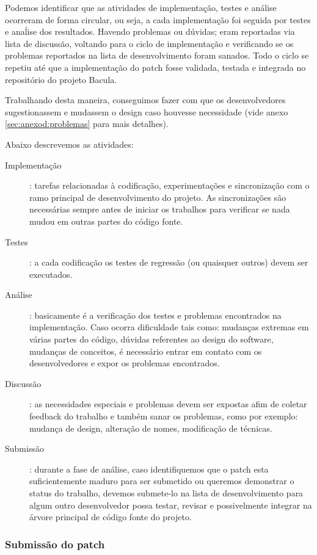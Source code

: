 Podemos identificar que as atividades de implementação, testes e análise ocorreram de forma circular, ou seja, a cada implementação foi seguida por testes e anaĺise dos resultados. Havendo problemas ou dúvidas; eram reportadas via lista de discussão, voltando para o ciclo de implementação e verificando se os problemas reportados na lista de desenvolvimento foram sanados. Todo o ciclo se repetiu até que a implementação do patch \patchshort fosse validada, testada e integrada no repositório do projeto Bacula.

Trabalhando desta maneira, conseguimos fazer com que os desenvolvedores sugestionassem e mudassem o design caso houvesse necessidade (vide anexo \ref{sec:anexod:problemas} para mais detalhes). 

Abaixo descrevemos as atividades:

\begin{description}
\item[Implementação]: tarefas relacionadas à codificação, experimentações e sincronização com o ramo principal de desenvolvimento do projeto. As sincronizações são necessárias sempre antes de iniciar os trabalhos para verificar se nada mudou em outras partes do código fonte.
\item[Testes]: a cada codificação os testes de regressão (ou quaisquer outros) devem ser executados.
\item[Análise]: basicamente é a verificação dos testes e problemas encontrados na implementação. Caso ocorra dificuldade tais como: mudanças extremas em várias partes do código, dúvidas referentes ao design do software, mudanças de conceitos, é necessário entrar em contato com os desenvolvedores e expor os problemas encontrados.
\item[Discussão]: as necessidades especiais e problemas devem ser expostas afim de coletar feedback do trabalho e também sanar os problemas, como por exemplo: mudança de design, alteração de nomes, modificação de técnicas.
\item[Submissão]: durante a fase de análise, caso identifiquemos que o patch esta suficientemente maduro para ser submetido ou queremos demonstrar o status do trabalho, devemos submete-lo na lista de desenvolvimento para algum outro desenvolvedor possa testar, revisar e possivelmente integrar na árvore principal de código fonte do projeto.
\end{description}

\subsubsection{Submissão do patch}

